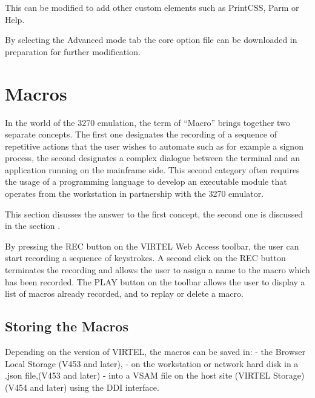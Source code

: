 \documentclass[letterpaper,10pt,english]{sphinxmanual}
\begin{document}
This can be modified to add other custom elements such as PrintCSS, Parm or Help.


By selecting the Advanced mode tab the core option file can be downloaded in preparation for further modification.



\section{Macros}
\label{\detokenize{User_Guide:macros}}
In the world of the 3270 emulation, the term of “Macro” brings together two separate concepts. The first one
designates the recording of a sequence of repetitive actions that the user wishes to automate such as for example a
signon process, the second designates a complex dialogue between the terminal and an application running on the
mainframe side. This second category often requires the usage of a programming language to develop an executable
module that operates from the workstation in partnership with the 3270 emulator.

This section disusses the answer to the first concept, the second one is discussed in the section {\hyperref[\detokenize{User_Guide:v457ug-virtel-scenarios}]{}}.

By pressing the REC button on the VIRTEL Web Access toolbar, the user can start recording a sequence of keystrokes. A
second click on the REC button terminates the recording and allows the user to assign a name to the macro which has
been recorded. The PLAY button on the toolbar allows the user to display a list of macros already recorded, and to replay or delete a
macro.



\subsection{Storing the Macros}
\label{\detokenize{User_Guide:storing-the-macros}}
Depending on the version of VIRTEL, the macros can be saved in:
- the Browser Local Storage (V453 and later),
- on the workstation or network hard disk in a .json file,(V453 and later)
- into a VSAM file on the host site (VIRTEL Storage) (V454 and later) using the DDI interface.
\end{document}
